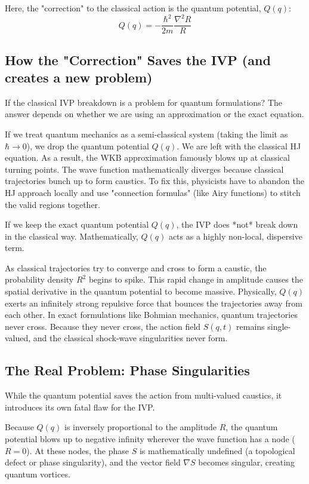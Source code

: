 \documentclass[11pt]{article}
\begin{document}
Here, the "correction" to the classical action is the quantum potential, $Q(q)$:
$$Q(q) = -\frac{\hbar^2}{2m} \frac{\nabla^2 R}{R}$$

\subsection{How the "Correction" Saves the IVP (and creates a new problem)}
If the classical IVP breakdown is a problem for quantum formulations?
The answer depends on whether we are using an approximation or the exact
equation.

If we treat quantum mechanics as a semi-classical system (taking the limit
as $\hbar \to 0$), we drop the quantum potential $Q(q)$. We are left with
the classical HJ equation. As a result, the WKB approximation famously 
blows up at classical turning points. The wave function mathematically
diverges because classical trajectories bunch up to form caustics. 
To fix this, physicists have to abandon the HJ approach locally and use
"connection formulas" (like Airy functions) to stitch the valid regions
together.

If we keep the exact quantum potential $Q(q)$, the IVP does *not* break down in the classical way. Mathematically, $Q(q)$ acts as a highly non-local, dispersive term. 

As classical trajectories try to converge and cross to form a caustic, 
the probability density $R^2$ begins to spike. This rapid change in
amplitude causes the spatial derivative in the quantum potential to become
massive. Physically, $Q(q)$ exerts an infinitely strong repulsive force
that bounces the trajectories away from each other. In exact formulations
like Bohmian mechanics, quantum trajectories never cross. Because they
never cross, the action field $S(q,t)$ remains single-valued, and the 
classical shock-wave singularities never form.

\subsection{The Real Problem: Phase Singularities}
While the quantum potential saves the action from multi-valued caustics, 
it introduces its own fatal flaw for the IVP. 

Because $Q(q)$ is inversely proportional to the amplitude $R$, the quantum
potential blows up to negative infinity wherever the wave function has a 
node ($R = 0$). At these nodes, the phase $S$ is mathematically undefined
(a topological defect or phase singularity), and the vector field 
$\nabla S$ becomes singular, creating quantum vortices.
\end{document}
